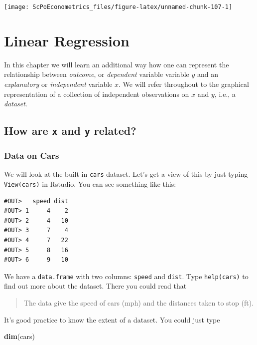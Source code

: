 \documentclass[]{book}
\newenvironment{Shaded}{\begin{snugshade}}{\end{snugshade}}
\newcommand{\KeywordTok}[1]{\textcolor[rgb]{0.13,0.29,0.53}{\textbf{#1}}}
\newcommand{\NormalTok}[1]{#1}
\begin{document}
\begin{center}\texttt{[image: ScPoEconometrics\_files/figure-latex/unnamed-chunk-107-1]} \end{center}

\chapter{Linear Regression}\label{linreg}

In this chapter we will learn an additional way how one can represent
the relationship between \emph{outcome}, or \emph{dependent} variable
variable \(y\) and an \emph{explanatory} or \emph{independent} variable
\(x\). We will refer throughout to the graphical representation of a
collection of independent observations on \(x\) and \(y\), i.e., a
\emph{dataset}.

\section{\texorpdfstring{How are \texttt{x} and \texttt{y}
related?}{How are x and y related?}}\label{how-are-x-and-y-related}

\subsection{Data on Cars}\label{data-on-cars}

We will look at the built-in \texttt{cars} dataset. Let's get a view of
this by just typing \texttt{View(cars)} in Rstudio. You can see
something like this:

\begin{verbatim}
#OUT>   speed dist
#OUT> 1     4    2
#OUT> 2     4   10
#OUT> 3     7    4
#OUT> 4     7   22
#OUT> 5     8   16
#OUT> 6     9   10
\end{verbatim}

We have a \texttt{data.frame} with two columns: \texttt{speed} and
\texttt{dist}. Type \texttt{help(cars)} to find out more about the
dataset. There you could read that

\begin{quote}
The data give the speed of cars (mph) and the distances taken to stop
(ft).
\end{quote}

It's good practice to know the extent of a dataset. You could just type

\begin{Shaded}
\begin{Highlighting}[]
\KeywordTok{dim}\NormalTok{(cars)}
\end{Highlighting}
\end{Shaded}
\end{document}

